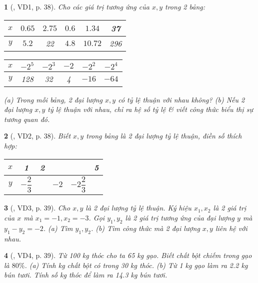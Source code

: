\documentclass{article}
\newtheorem{baitoan}{}
\begin{document}
\begin{baitoan}[\cite{Binh_boi_duong_Toan_7_tap_1}, VD1, p. 38]
	Cho các giá trị tương ứng của $x,y$ trong 2 bảng:
	\begin{table}[H]
		\centering
		\begin{tabular}{|c|c|c|c|c|c|}
			\hline
			$x$ & $0.65$ & $2.75$ & $0.6$ & $1.34$ & 37 \\
			\hline
			$y$ & $5.2$ & 22 & $4.8$ & $10.72$ & 296 \\
			\hline
		\end{tabular}\hspace{1cm}
		\begin{tabular}{|c|c|c|c|c|c|}
			\hline
			$x$ & $-2^5$ & $-2^3$ & $-2$ & $-2^2$ & $-2^4$ \\
			\hline
			$y$ & 128 & 32 & 4 & $-16$ & $-64$ \\
			\hline
		\end{tabular}
	\end{table}
	\noindent(a) Trong mỗi bảng, 2 đại lượng $x,y$ có tỷ lệ thuận với nhau không? (b) Nếu 2 đại lượng $x,y$ tỷ lệ thuận với nhau, chỉ ra hệ số tỷ lệ \& viết công thức biểu thị sự tương quan đó.
\end{baitoan}

\begin{baitoan}[\cite{Binh_boi_duong_Toan_7_tap_1}, VD2, p. 38]
	Biết $x,y$ trong bảng là 2 đại lượng tỷ lệ thuận, điền số thích hợp:
	\begin{table}[H]
		\centering
		\begin{tabular}{|c|c|c|c|c|c|}
			\hline
			$x$ & 1 & 2 & & & 5 \\
			\hline
			$y$ & $-\dfrac{2}{3}$ & & $-2$ & $-2\dfrac{2}{3}$ & \\
			\hline
		\end{tabular}
	\end{table}
\end{baitoan}

\begin{baitoan}[\cite{Binh_boi_duong_Toan_7_tap_1}, VD3, p. 39]
	Cho $x,y$ là 2 đại lượng tỷ lệ thuận. Ký hiệu $x_1,x_2$ là 2 giá trị của $x$ mà $x_1 = -1,x_2 = -3$. Gọi $y_1,y_2$ là 2 giá trị tương ứng của đại lượng $y$ mà $y_1 - y_2 = -2$. (a) Tìm $y_1,y_2$. (b) Tìm công thức mà 2 đại lượng $x,y$ liên hệ với nhau.
\end{baitoan}

\begin{baitoan}[\cite{Binh_boi_duong_Toan_7_tap_1}, VD4, p. 39]
	Từ {\rm100 kg} thóc cho ta {\rm65 kg} gạo. Biết chất bột chiếm trong gạo là $80\%$. (a) Tính {\rm kg} chất bột có trong {\rm30 kg} thóc. (b) Từ {\rm1 kg} gạo làm ra {\rm2.2 kg} bún tươi. Tính số {\rm kg} thóc để làm ra {\rm14.3 kg} bún tươi.
\end{baitoan}
\end{document}

